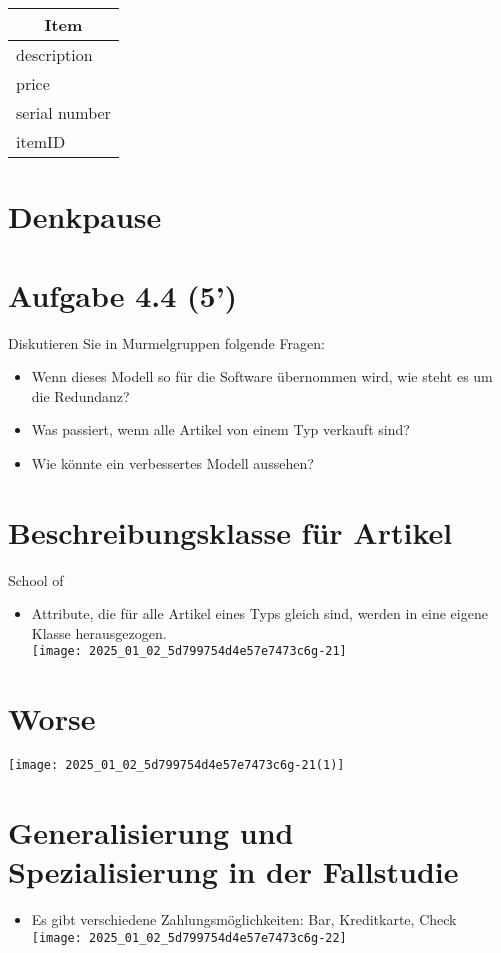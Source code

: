 \documentclass[10pt]{article}
\begin{document}
\begin{center}
\begin{tabular}{|l|}
\hline
\multicolumn{1}{|c|}{Item} \\
\hline
description \\
price \\
serial number \\
itemID \\
\hline
\end{tabular}
\end{center}

\section*{Denkpause}
\section*{Aufgabe 4.4 (5’)}
Diskutieren Sie in Murmelgruppen folgende Fragen:

\begin{itemize}
  \item Wenn dieses Modell so für die Software übernommen wird, wie steht es um die Redundanz?
  \item Was passiert, wenn alle Artikel von einem Typ verkauft sind?
  \item Wie könnte ein verbessertes Modell aussehen?
\end{itemize}

\section*{Beschreibungsklasse für Artikel}
School of

\begin{itemize}
  \item Attribute, die für alle Artikel eines Typs gleich sind, werden in eine eigene Klasse herausgezogen.\\
\texttt{[image: 2025\_01\_02\_5d799754d4e57e7473c6g-21]}
\end{itemize}

\section*{Worse}
\begin{center}
\texttt{[image: 2025\_01\_02\_5d799754d4e57e7473c6g-21(1)]}
\end{center}

\section*{Generalisierung und Spezialisierung in der Fallstudie}
\begin{itemize}
  \item Es gibt verschiedene Zahlungsmöglichkeiten: Bar, Kreditkarte, Check\\
\texttt{[image: 2025\_01\_02\_5d799754d4e57e7473c6g-22]}
\end{itemize}
\end{document}
